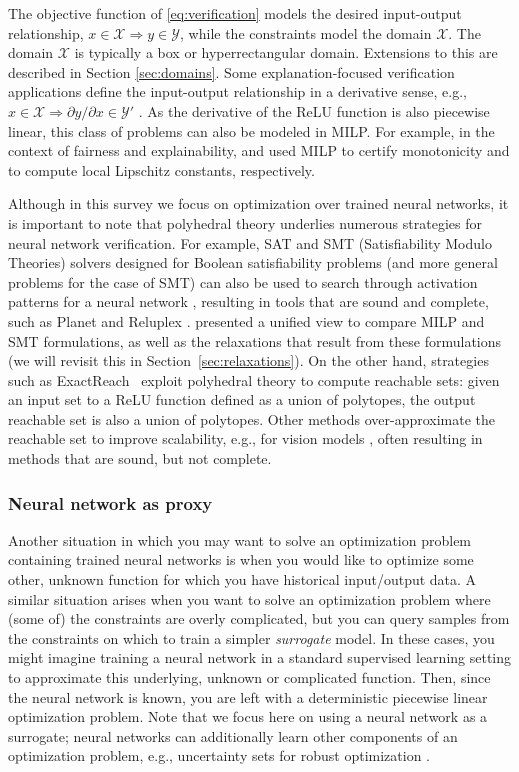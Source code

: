 The objective function of \eqref{eq:verification} models the desired input-output relationship, $x \in \mathcal{X} \Rightarrow y \in \mathcal{Y}$, while the constraints model the domain $\mathcal{X}$. 
The domain $\mathcal{X}$ is typically a box or hyperrectangular domain. Extensions to this are described in Section \ref{sec:domains}.
Some explanation-focused verification applications define the input-output relationship in a derivative sense, e.g., $x \in \mathcal{X} \Rightarrow \partial y / \partial x \in \mathcal{Y}'$ \citep{wicker2022robust}. 
As the derivative of the ReLU function is also piecewise linear, this class of problems can also be modeled in MILP. For example, in the context of fairness and explainability, \cite{liu2020monotonic} and \cite{jordan2020exact} used MILP to certify monotonicity and to compute local Lipschitz constants, respectively. 


Although in this survey we focus on optimization over trained neural networks, it is important to note that polyhedral theory underlies numerous strategies for neural network verification. 
For example, SAT and SMT (Satisfiability Modulo Theories) solvers designed for Boolean satisfiability problems (and more general problems for the case of SMT) can also be used to search through activation patterns for a neural network \citep{pulina2010abstraction}, resulting in tools that are sound and complete, such as Planet \citep{ehlers2017formal} and Reluplex \citep{katz2017reluplex}. 
\cite{bunel2018unified} presented a unified view to compare MILP and SMT formulations, as well as the relaxations that result from these formulations (we will revisit this in Section~\ref{sec:relaxations}).  
On the other hand, strategies such as ExactReach~\citep{xiang2017reachable} exploit polyhedral theory to compute reachable sets: given an input set to a ReLU function defined as a union of polytopes, the output reachable set is also a union of polytopes. 
Other methods over-approximate the reachable set to improve scalability, e.g., for vision models \citep{yang2021reachability}, often resulting in methods that are sound, but not complete. 


\subsubsection{Neural network as proxy}
Another situation in which you may want to solve an optimization problem containing trained neural networks is when you would like to optimize some other, unknown function for which you have historical input/output data. 
A similar situation arises when you want to solve an optimization problem where (some of) the constraints are overly complicated, but you can query samples from the constraints on which to train a simpler \textit{surrogate} model. 
In these cases, you might imagine training a neural network in a standard supervised learning setting to approximate this underlying, unknown or complicated function. Then, since the neural network is known, you are left with a deterministic piecewise linear optimization problem. 
Note that we focus here on using a neural network as a surrogate; neural networks can additionally learn other components of an optimization problem, e.g., uncertainty sets for robust optimization \citep{goerigk2023data}. 

